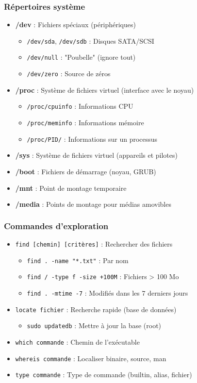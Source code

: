 \documentclass[12pt,a4paper]{article}
\begin{document}
\subsubsection{Répertoires système}
\begin{itemize}
    \item \textbf{/dev} : Fichiers spéciaux (périphériques)
    \begin{itemize}
        \item \texttt{/dev/sda}, \texttt{/dev/sdb} : Disques SATA/SCSI
        \item \texttt{/dev/null} : "Poubelle" (ignore tout)
        \item \texttt{/dev/zero} : Source de zéros
    \end{itemize}
    \item \textbf{/proc} : Système de fichiers virtuel (interface avec le noyau)
    \begin{itemize}
        \item \texttt{/proc/cpuinfo} : Informations CPU
        \item \texttt{/proc/meminfo} : Informations mémoire
        \item \texttt{/proc/PID/} : Informations sur un processus
    \end{itemize}
    \item \textbf{/sys} : Système de fichiers virtuel (appareils et pilotes)
    \item \textbf{/boot} : Fichiers de démarrage (noyau, GRUB)
    \item \textbf{/mnt} : Point de montage temporaire
    \item \textbf{/media} : Points de montage pour médias amovibles
\end{itemize}

\subsubsection{Commandes d'exploration}
\begin{itemize}
    \item \texttt{find [chemin] [critères]} : Rechercher des fichiers
    \begin{itemize}
        \item \texttt{find . -name "*.txt"} : Par nom
        \item \texttt{find / -type f -size +100M} : Fichiers > 100 Mo
        \item \texttt{find . -mtime -7} : Modifiés dans les 7 derniers jours
    \end{itemize}
    \item \texttt{locate fichier} : Recherche rapide (base de données)
    \begin{itemize}
        \item \texttt{sudo updatedb} : Mettre à jour la base (root)
    \end{itemize}
    \item \texttt{which commande} : Chemin de l'exécutable
    \item \texttt{whereis commande} : Localiser binaire, source, man
    \item \texttt{type commande} : Type de commande (builtin, alias, fichier)
\end{itemize}
\end{document}
